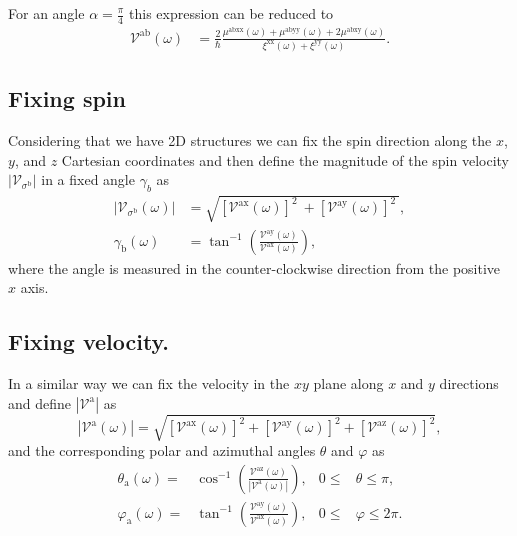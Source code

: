 \documentclass[prb,11pt,tightenlines,twocolumn,aps]{revtex4-1}
\begin{document}
For an angle $\alpha = \frac{\pi}{4}$ this expression can be reduced to 
\begin{align}
\mathcal{V}^{\mathrm{ab}} (\omega)
&= \frac{2}{\hbar}
\frac{\mu^{\mathrm{abxx}}(\omega) + \mu^{\mathrm{abyy}}(\omega) + 
2\mu^{\mathrm{abxy}}(\omega)}
{\xi^{\mathrm{xx}}(\omega) + \xi^{\mathrm{yy}}(\omega)}.
\label{eq:vab-90deg}
\end{align}




\subsection{Fixing spin}\label{sec:theory-fixspin}
Considering that we have 2D structures we can fix the spin direction along the
$x$, $y$, and $z$ Cartesian coordinates and then define the magnitude of the
spin velocity $|\mathcal{V}_{\sigma^{\mathrm{b}}}|$ in a fixed angle
$\gamma_{b}$ as
\begin{align}
|\mathcal{V}_{\sigma^{\mathrm{b}}}(\omega)| 
&=
\sqrt{
[\mathcal{V}^{\mathrm{ax}}(\omega)]^{2}\ +
[\mathcal{V}^{\mathrm{ay}}(\omega)]^{2}\ 
}, 
\label{eq:vs-mag}
\\
\gamma_{\mathrm{b}} (\omega)
&=
\tan^{-1} \left( \frac{\mathcal{V}^{\mathrm{ay}}(\omega)}
{\mathcal{V}^{\mathrm{ax}}(\omega)} \right),
\label{eq:gamma-ang}
\end{align}
where the angle is measured in the counter-clockwise direction from the positive
$x$ axis.




\subsection{Fixing velocity.}\label{sec:theory-fixvel}

In a similar way we can fix the velocity in the $xy$ plane
along $x$ and $y$ directions and define $|\mathcal{V}^{\mathrm{a}}|$ as
\begin{equation}
|\mathcal{V}^{\mathrm{a}}(\omega)| = 
\sqrt {
[\mathcal{V}^{\mathrm{ax}}(\omega)]^{2} +
[\mathcal{V}^{\mathrm{ay}}(\omega)]^{2} +
[\mathcal{V}^{\mathrm{az}}(\omega)]^{2} 
},
\label{eq:vv-mag}
\end{equation}
and the corresponding polar and azimuthal angles $\theta$ and $\varphi$ as
\begin{align}
\theta_{\mathrm{a}}  (\omega)
=& 
\cos^{-1} \left( \frac{\mathcal{V}^{\mathrm{az}}(\omega)}
{|\mathcal{V}^{\mathrm{a}}(\omega)|} \right),
& 0 \leq &\theta \leq \pi, 
\label{eq:polar-ang}
\\
\varphi_{\mathrm{a}} (\omega)
=& 
\tan^{-1} \left( \frac{\mathcal{V}^{\mathrm{ay}}(\omega)}
{\mathcal{V}^{\mathrm{ax}}(\omega)} \right),
& 0 \leq &\varphi \leq 2\pi.
\label{eq:azimuthal-ang} 
\end{align}
\end{document}
